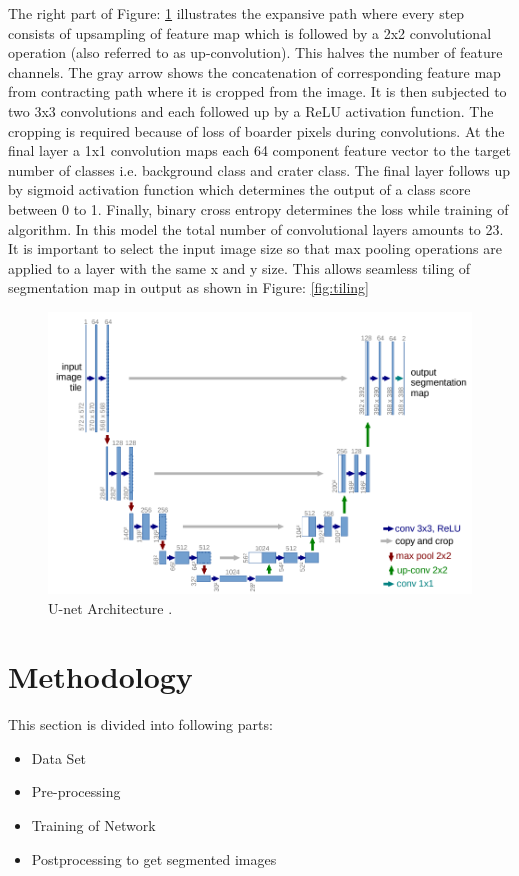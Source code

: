 \documentclass[11pt]{article}
\begin{document}
The right part of Figure: \ref{fig:U-net} illustrates the expansive path where every step consists of upsampling of feature map which is followed by a 2x2 convolutional operation (also referred to as up-convolution). This halves the number of feature channels. The gray arrow shows the concatenation of corresponding feature map from contracting path where it is cropped from the image. It is then subjected to two 3x3 convolutions and each followed up by a ReLU activation function. The cropping is required because of loss of boarder pixels during convolutions. At the final layer a 1x1 convolution maps each 64 component feature vector to the target number of classes i.e. background class and crater class. The final layer follows up by sigmoid activation function which determines the output of a class score between 0 to 1. Finally, binary cross entropy determines the loss while training of algorithm. In this model the total number of convolutional layers amounts to 23. It is important to select the input image size so that max pooling operations are applied to a layer with the same x and y size. This allows seamless tiling of segmentation map in output as shown in Figure: \ref{fig:tiling}

\begin{figure}[ht!]
	\centering
	\includegraphics[width=.7\linewidth]{files/unet/arch.png}
	\caption{U-net Architecture \cite{ronneberger2015u}.}
	\label{fig:U-net}
\end{figure} 

\section{Methodology}
This section is divided into following parts:

\begin{itemize}
 \item{Data Set}
 \item{Pre-processing}
 \item{Training of Network}
 \item{Postprocessing to get segmented images}
\end{itemize}
\end{document}
